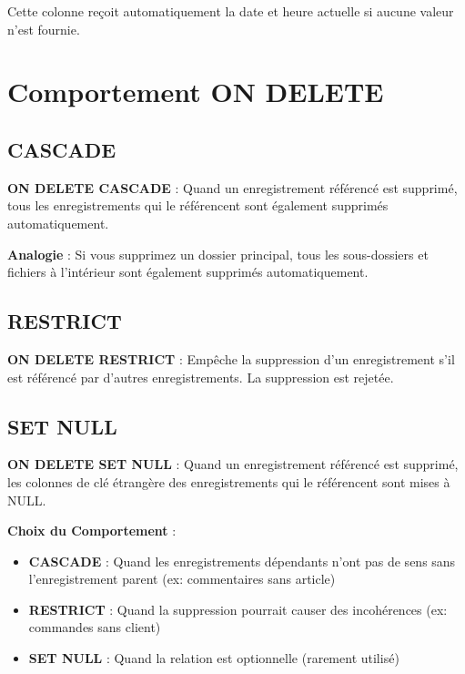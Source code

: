 Cette colonne reçoit automatiquement la date et heure actuelle si aucune valeur n'est fournie.

\section{Comportement ON DELETE}

\subsection{CASCADE}

\begin{definitionbox}
    \textbf{ON DELETE CASCADE} : Quand un enregistrement référencé est supprimé, tous les enregistrements qui le référencent sont également supprimés automatiquement.
\end{definitionbox}

\begin{analogybox}
    \textbf{Analogie} : Si vous supprimez un dossier principal, tous les sous-dossiers et fichiers à l'intérieur sont également supprimés automatiquement.
\end{analogybox}

\subsection{RESTRICT}

\begin{definitionbox}
    \textbf{ON DELETE RESTRICT} : Empêche la suppression d'un enregistrement s'il est référencé par d'autres enregistrements. La suppression est rejetée.
\end{definitionbox}

\subsection{SET NULL}

\begin{definitionbox}
    \textbf{ON DELETE SET NULL} : Quand un enregistrement référencé est supprimé, les colonnes de clé étrangère des enregistrements qui le référencent sont mises à NULL.
\end{definitionbox}

\begin{bestpracticebox}
    \textbf{Choix du Comportement} :
    \begin{itemize}
        \item \textbf{CASCADE} : Quand les enregistrements dépendants n'ont pas de sens sans l'enregistrement parent (ex: commentaires sans article)
        \item \textbf{RESTRICT} : Quand la suppression pourrait causer des incohérences (ex: commandes sans client)
        \item \textbf{SET NULL} : Quand la relation est optionnelle (rarement utilisé)
    \end{itemize}
\end{bestpracticebox}

